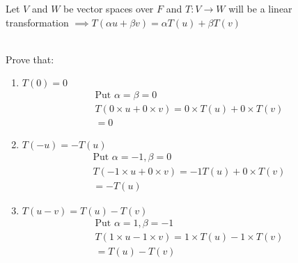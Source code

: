 \documentclass[english,course,fleqn]{lecture}
\begin{document}
\begin{theorem}
	Let $V$ and $W$ be vector spaces over $F$ and $T:V\rightarrow W$ will be a linear transformation
	$\implies T(\alpha u + \beta v) = \alpha T(u) + \beta T(v)$

	\\
	Prove that:

	\begin{enumerate}
		\item $T(0) = 0$
		      \begin{gather*}
			      \text{Put } \alpha = \beta = 0\\
			      T(0\times u + 0\times v) = 0\times T(u) + 0\times T(v)\\
			      = 0
		      \end{gather*}
		\item $T(-u) = - T(u)$
		      \begin{gather*}
			      \text{Put } \alpha = -1, \beta = 0\\
			      T(-1\times u + 0\times v) = -1 T(u) + 0\times T(v)\\
			      = -T(u)
		      \end{gather*}
		\item $T(u-v) = T(u) - T(v)$
		      \begin{gather*}
			      \text{Put } \alpha = 1, \beta = -1\\
			      T(1\times u - 1\times v) = 1\times T(u) - 1\times T(v)\\
			      = T(u) - T(v)
		      \end{gather*}
	\end{enumerate}
\end{theorem}
\end{document}

